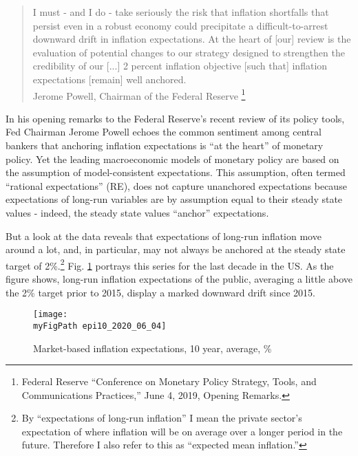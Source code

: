 \documentclass[11pt]{article}
\def \myFigPath {../../figures/}
\renewcommand{\[}{\begin{equation}}
\renewcommand{\]}{\end{equation}}
\def\mySmallFigScale{0.22}
\begin{document}
\begin{quote}
I must - and I do - take seriously the risk that inflation shortfalls that persist even in a robust economy could precipitate a difficult-to-arrest downward drift in inflation expectations. At the heart of [our] review is the evaluation of potential changes to our strategy designed to strengthen the credibility of our [...] 2 percent inflation objective [such that] inflation expectations [remain] well anchored.\\
Jerome Powell, Chairman of the Federal Reserve \footnote{Federal Reserve ``Conference on Monetary Policy Strategy, Tools, and Communications Practices,''  June 4, 2019, Opening Remarks.}
\end{quote}

In his opening remarks to the Federal Reserve's recent review of its policy tools, Fed Chairman Jerome Powell echoes the common sentiment among central bankers that anchoring inflation expectations is ``at the heart'' of monetary policy. Yet the leading macroeconomic models of monetary policy are based on the assumption of model-consistent expectations. This assumption, often termed ``rational expectations'' (RE), does not capture unanchored expectations because expectations of long-run variables are by assumption equal to their steady state values - indeed, the steady state values ``anchor'' expectations. 

But a look at the data reveals that expectations of long-run inflation move around a lot, and, in particular, may not always be anchored at the steady state target of 2\%.\footnote{By ``expectations of long-run inflation'' I mean the private sector's expectation of where inflation will be on average over a longer period in the future. Therefore I also refer to this as ``expected mean inflation.''} Fig. \ref{epi} portrays this series for the last decade in the US. As the figure shows, long-run inflation expectations of the public, averaging a little above the 2\% target prior to 2015, display a marked downward drift since 2015. 

\begin{figure}[h!]
\texttt{[image: \\myFigPath epi10\_2020\_06\_04]}
\caption{Market-based inflation expectations, 10 year, average, \%}
\label{epi}
\end{figure}
\end{document}

